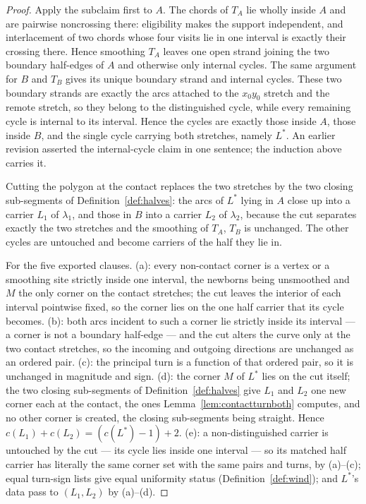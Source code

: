 \begin{proof}
Apply the subclaim first to $A$. The chords of $T_A$ lie wholly inside $A$ and are pairwise
noncrossing there: eligibility makes the support independent, and interlacement of two chords
whose four visits lie in one interval is exactly their crossing there. Hence smoothing $T_A$
leaves one open strand joining the two boundary half-edges of $A$ and otherwise only internal
cycles. The same argument for $B$ and $T_B$ gives its unique boundary strand and internal
cycles. These two boundary strands are exactly the arcs attached to the $x_0y_0$ stretch and
the remote stretch, so they belong to the distinguished cycle, while every remaining cycle is
internal to its interval. Hence the cycles are exactly those inside $A$, those inside $B$, and
the single cycle carrying both stretches, namely $L^{*}$. An earlier revision asserted the
internal-cycle claim in one sentence; the induction above carries it.

Cutting the polygon at the contact replaces the two stretches by the two
closing sub-segments of Definition~\ref{def:halves}: the arcs of $L^{*}$ lying
in $A$ close up into a carrier $L_1$ of $\lambda_1$, and those in $B$ into a
carrier $L_2$ of $\lambda_2$, because the cut separates exactly the two
stretches and the smoothing of $T_A$, $T_B$ is unchanged. The other cycles are
untouched and become carriers of the half they lie in.

For the five exported clauses. (a): every non-contact corner is a vertex or a
smoothing site strictly inside one interval, the newborns being unsmoothed and
$M$ the only corner on the contact stretches; the cut leaves the interior of
each interval pointwise fixed, so the corner lies on the one half carrier that
its cycle becomes. (b): both arcs incident to such a corner lie strictly
inside its interval --- a corner is not a boundary half-edge --- and the cut
alters the curve only at the two contact stretches, so the incoming and
outgoing directions are unchanged as an ordered pair. (c): the principal turn
is a function of that ordered pair, so it is unchanged in magnitude and sign.
(d): the corner $M$ of $L^{*}$ lies on the cut itself; the two closing
sub-segments of Definition~\ref{def:halves} give $L_1$ and $L_2$ one new
corner each at the contact, the ones Lemma~\ref{lem:contactturnboth} computes,
and no other corner is created, the closing sub-segments being straight. Hence
$c(L_1)+c(L_2)=(c(L^{*})-1)+2$. (e): a non-distinguished carrier is untouched
by the cut --- its cycle lies inside one interval --- so its matched half
carrier has literally the same corner set with the same pairs and turns, by
(a)--(c); equal turn-sign lists give equal uniformity status
(Definition~\ref{def:wind}); and $L^{*}$'s data pass to $(L_1,L_2)$ by
(a)--(d).
\end{proof}

